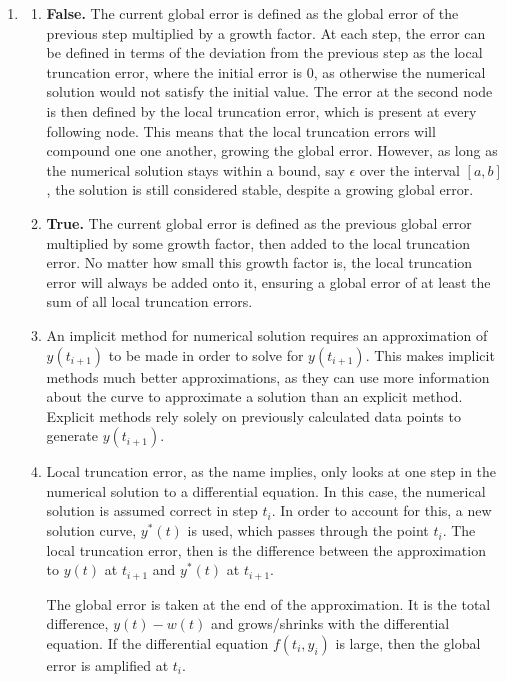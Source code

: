 \documentclass[11pt]{article}
\begin{document}
\begin{enumerate}
	\item

	\begin{enumerate}

		\item \textbf{False.} The current global error is defined as the global error of the previous step multiplied by a growth factor. At each step, the error can be defined in terms of the deviation from the previous step as the local truncation error, where the initial error is 0, as otherwise the numerical solution would not satisfy the initial value. The error at the second node is then defined by the local truncation error, which is present at every following node. This means that the local truncation errors will compound one one another, growing the global error. However, as long as the numerical solution stays within a bound, say $\epsilon$ over the interval $[a,b]$, the solution is still considered stable, despite a growing global error.

		\medskip

		\item \textbf{True.} The current global error is defined as the previous global error multiplied by some growth factor, then added to the local truncation error. No matter how small this growth factor is, the local truncation error will always be added onto it, ensuring a global error of at least the sum of all local truncation errors.

		\medskip

		\item An implicit method for numerical solution requires an approximation of $y(t_{i+1})$ to be made in order to solve for $y(t_{i+1})$. This makes implicit methods much better approximations, as they can use more information about the curve to approximate a solution than an explicit method. Explicit methods rely solely on previously calculated data points to generate $y(t_{i+1})$.

		\medskip

		\item Local truncation error, as the name implies, only looks at one step in the numerical solution to a differential equation. In this case, the numerical solution is assumed correct in step $t_i$. In order to account for this, a new solution curve, $y^*(t)$ is used, which passes through the point $t_i$. The local truncation error, then is the difference between the approximation to $y(t)$ at $t_{i+1}$ and $y^*(t)$ at $t_{i+1}$.

		The global error is taken at the end of the approximation. It is the total difference, $y(t)-w(t)$ and grows/shrinks with the differential equation. If the differential equation $f(t_i,y_i)$ is large, then the global error is amplified at $t_i$.


\end{enumerate}
\end{enumerate}
\end{document}
